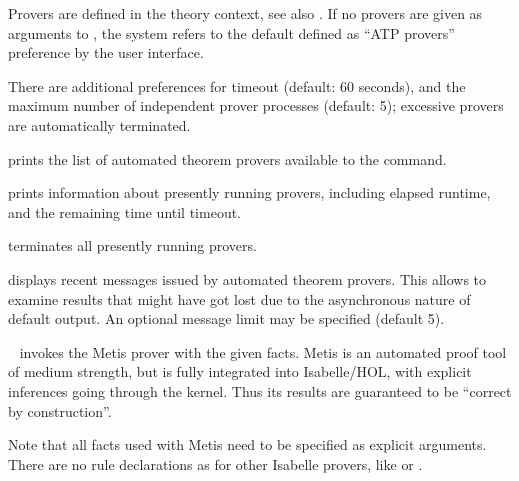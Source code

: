 \begin{isabellebody}
\begin{isamarkuptext}
\begin{description}
  Provers are defined in the theory context, see also \hyperlink{command.HOL.print-atps}{\mbox{}}.  If no provers are given as arguments to \hyperlink{command.HOL.sledgehammer}{\mbox{}}, the system refers to the default defined as
  ``ATP provers'' preference by the user interface.

  There are additional preferences for timeout (default: 60 seconds),
  and the maximum number of independent prover processes (default: 5);
  excessive provers are automatically terminated.

  \item \hyperlink{command.HOL.print-atps}{\mbox{}} prints the list of automated
  theorem provers available to the \hyperlink{command.HOL.sledgehammer}{\mbox{}}
  command.

  \item \hyperlink{command.HOL.atp-info}{\mbox{}} prints information about presently
  running provers, including elapsed runtime, and the remaining time
  until timeout.

  \item \hyperlink{command.HOL.atp-kill}{\mbox{}} terminates all presently running
  provers.

  \item \hyperlink{command.HOL.atp-messages}{\mbox{}} displays recent messages issued
  by automated theorem provers.  This allows to examine results that
  might have got lost due to the asynchronous nature of default
  \hyperlink{command.HOL.sledgehammer}{\mbox{}} output.  An optional message limit may
  be specified (default 5).

  \item \hyperlink{method.HOL.metis}{\mbox{}}~ invokes the Metis prover
  with the given facts.  Metis is an automated proof tool of medium
  strength, but is fully integrated into Isabelle/HOL, with explicit
  inferences going through the kernel.  Thus its results are
  guaranteed to be ``correct by construction''.

  Note that all facts used with Metis need to be specified as explicit
  arguments.  There are no rule declarations as for other Isabelle
  provers, like \hyperlink{method.blast}{\mbox{}} or \hyperlink{method.fast}{\mbox{}}.


\end{description}
\end{isamarkuptext}
\end{isabellebody}
